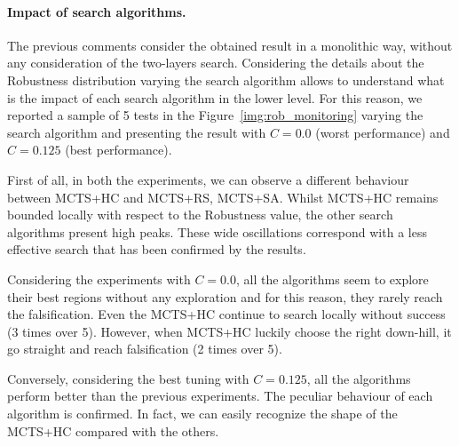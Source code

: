 \documentclass[11pt]{article}
\begin{document}
\paragraph{Impact of search algorithms.}
The previous comments consider the obtained result in a monolithic way, without any consideration of the two-layers search. Considering the details about the Robustness distribution varying the search algorithm allows to understand what is the impact of each search algorithm in the lower level. For this reason, we reported a sample of 5 tests in the Figure~\ref{img:rob_monitoring} varying the search algorithm and presenting the result with $C=0.0$ (worst performance) and $C=0.125$ (best performance).

First of all, in both the experiments, we can observe a different behaviour between MCTS+HC and MCTS+RS, MCTS+SA. Whilst MCTS+HC remains bounded locally with respect to the Robustness value, the other search algorithms present high peaks. These wide oscillations correspond with a less effective search that has been confirmed by the results.

Considering the experiments with $C=0.0$, all the algorithms seem to explore their best regions without any exploration and for this reason, they rarely reach the falsification. Even the MCTS+HC continue to search locally without success (3 times over 5). However, when MCTS+HC luckily choose the right down-hill, it go straight and reach falsification (2 times over 5).

Conversely, considering the best tuning with $C=0.125$, all the algorithms perform better than the previous experiments. The peculiar behaviour of each algorithm is confirmed. In fact, we can easily recognize the shape of the MCTS+HC compared with the others.
\end{document}
